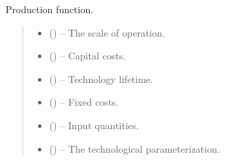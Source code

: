 \documentclass[letterpaper,10pt,english]{sphinxmanual}
\begin{document}

\begin{fulllineitems}
\label{\detokenize{technology:technology.pv_residential_large.production}}
\pysigstartsignatures
{}
\pysigstopsignatures
\sphinxAtStartPar
Production function.
\begin{quote}\begin{description}
\begin{itemize}
\item {} 
\sphinxAtStartPar
{} () – The scale of operation.

\item {} 
\sphinxAtStartPar
{} () – Capital costs.

\item {} 
\sphinxAtStartPar
{} () – Technology lifetime.

\item {} 
\sphinxAtStartPar
{} () – Fixed costs.

\item {} 
\sphinxAtStartPar
{} () – Input quantities.

\item {} 
\sphinxAtStartPar
{} () – The technological parameterization.

\end{itemize}

\end{description}\end{quote}

\end{fulllineitems}
\end{document}
